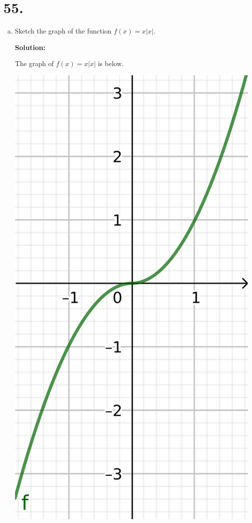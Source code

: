 \documentclass{article}
\newenvironment{solution}{
    \par \textbf{Solution: } \quad \par
}{\par}
\begin{document}
    \section*{55.}

    \begin{enumerate}[(a)]
        \item Sketch the graph of the function $f(x) = x|x|$.

        \begin{solution}
            The graph of $f(x) = x|x|$ is below.

            \centering \includegraphics[scale=3.0]{geogebra-export.png}
        \end{solution}



\end{enumerate}
\end{document}
